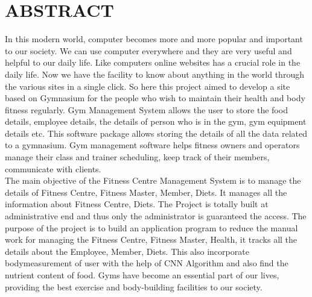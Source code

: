 \documentclass[a4paper,12pt,toc=flat]{report}
\begin{document}
	\section*{\centering \bf \large ABSTRACT}
	\vspace*{20pt}
		\par
	\hspace*{12pt}
	In this modern world, computer becomes more and more popular and important to our society. We can use computer everywhere and they are very useful and helpful to our daily life. Like computers online websites has a crucial role in the daily life. Now we have the facility to know about anything in the world through the various sites in a single click. So here this project aimed to develop a site based on Gymnasium for the people who wish to maintain their health and body fitness regularly. Gym Management System allows the user to store the food details, employee details, the details of person who is in the gym, gym equipment details etc.  This software package allows storing the details of all the data related to a gymnasium. Gym management software helps fitness owners and operators manage their class and trainer scheduling, keep track of their members, communicate with clients.\\
	\hspace*{12pt}
	The main objective of the Fitness Centre Management System is to manage the details of Fitness Centre, Fitness Master,  Member, Diets. It manages all the information about Fitness Centre,  Diets. The Project is totally built at administrative end and thus only the administrator is guaranteed the access. The purpose of the project is to build an application program to reduce the manual work for managing the Fitness Centre, Fitness Master, Health,  it tracks all the details about the Employee, Member, Diets. This  also incorporate bodymeasurement of user with the help of CNN Algorithm and also find the nutrient content of food.  Gyms have become an essential part of our lives, providing the best exercise and body-building facilities to our society.
	\pagebreak
	
	\tableofcontents{}
	
	\pagebreak
	\listoffigures
	
    \pagebreak
    
    \listoftables
    
    \pagebreak
	
\end{document}
